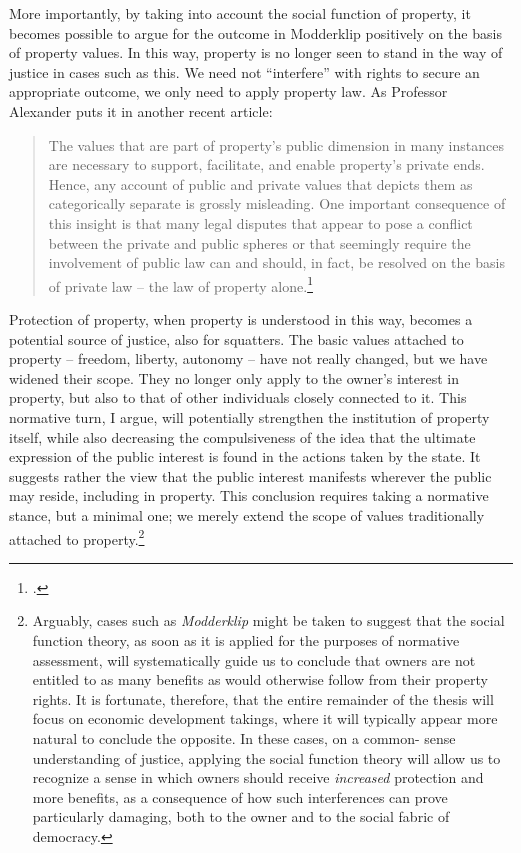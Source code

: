 More importantly, by taking into account the social function of property, it becomes possible to argue for the outcome in Modderklip positively on the basis of property values. In this way, property is no longer seen to stand in the way of justice in cases such as this. We need not ``interfere'' with rights to secure an appropriate outcome, we only need to apply property law. As Professor Alexander puts it in another recent article: 

\begin{quote} The values that are
part of property's public dimension in many instances are necessary
to support, facilitate, and enable property's private ends.
Hence, any account of public and private values that depicts them as categorically
separate is grossly misleading. One important consequence of this
insight is that many legal disputes that appear to pose a conflict between
the private and public spheres or that seemingly
require the involvement of public law can and
should, in fact, be resolved on the basis of private law -- the law
of property alone.\footcite[1295-1296]{alexander14} \end{quote}

Protection of property, when property is understood in this way, becomes a potential source of justice, also for squatters. The basic values attached to property -- freedom, liberty, autonomy -- have not really changed, but we have widened their scope. They no longer only apply to the owner's interest in property, but also to that of other individuals closely connected to it. This normative turn, I argue, will potentially strengthen the institution of property itself, while also decreasing the compulsiveness of the idea that the ultimate expression of the public interest is found in the actions taken by the state. It suggests rather the view that the public interest manifests wherever the public may reside, including in property. This conclusion requires taking a normative stance, but a minimal one; we merely extend the scope of values traditionally attached to property.\footnote{Arguably, cases such as {\it Modderklip} might be taken to suggest that the social function theory, as soon as it is applied for the purposes of normative assessment, will systematically guide us to conclude that owners are not entitled to as many benefits as would otherwise follow from their property rights. It is fortunate, therefore, that the entire remainder of the thesis will focus on economic development takings, where it will typically appear more natural to conclude the opposite. In these cases, on a common- sense understanding of justice, applying the social function theory will allow us to recognize a sense in which owners should receive {\it increased} protection and more benefits, as a consequence of how such interferences can prove particularly damaging, both to the owner and to the social fabric of democracy.} 

